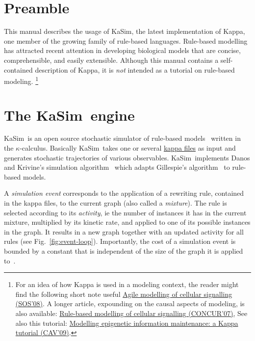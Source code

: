 \documentclass[11pt]{book}
\def\KaSim{\textsf{KaSim}}
\def\ka{\kappa}
\def\ie{ie }
\begin{document}
\section{Preamble}
This manual describes the usage of \KaSim, the latest implementation of Kappa, one member of the growing family of rule-based languages. Rule-based modelling has attracted recent attention in developing biological models that are concise, comprehensible, and easily extensible. 
Although this manual contains a self-contained description of Kappa, it is \emph{not} intended as a tutorial on rule-based modeling.%
%
\footnote{For an idea of how Kappa is used in a modeling context, the reader might find the following short note useful \href{http://www.pps.jussieu.fr/~danos/pdf/eov.pdf}{Agile modelling of cellular signalling (SOS'08)}. A longer article, expounding on the causal aspects of modeling, is also available: \href{http://www.pps.jussieu.fr/~danos/pdf/ka-fix.pdf}{Rule-based modelling of cellular signalling (CONCUR'07)}, See also this tutorial: \href{http://www.pps.jussieu.fr/~danos/pdf/mytdg.pdf}{Modelling epigenetic information maintenance: a Kappa tutorial (CAV'09)}. 
}%



\section{The \KaSim~engine}
\KaSim~is an open source stochastic simulator of rule-based models~\cite{DanLan04,Dan_etal07a,Fae_etal05} written in the $\ka$-calculus. Basically \KaSim~takes one or several \hyperref[chap:kappa]{kappa files} as input and generates stochastic trajectories of various observables. \KaSim~implements Danos and Krivine's simulation algorithm~\cite{Dan_etal07b} which adapts Gillespie's algorithm~\cite{Gil76,Gil77} to rule-based models. 

A \emph{simulation event} corresponds to the application of a rewriting rule, contained in the kappa files, to the current graph (also called a \emph{mixture}). The rule is selected according to its \emph{activity}, \ie the number of instances it has in the current mixture, multiplied by its kinetic rate, and applied to one of its possible instances in the graph. It results in a new graph together with an updated activity for all rules (see Fig.~\ref{fig:event-loop}). Importantly, the cost of a simulation event is bounded by a constant that is independent of the size of the graph it is applied to~\cite{Dan_etal07b}. 
\end{document}
